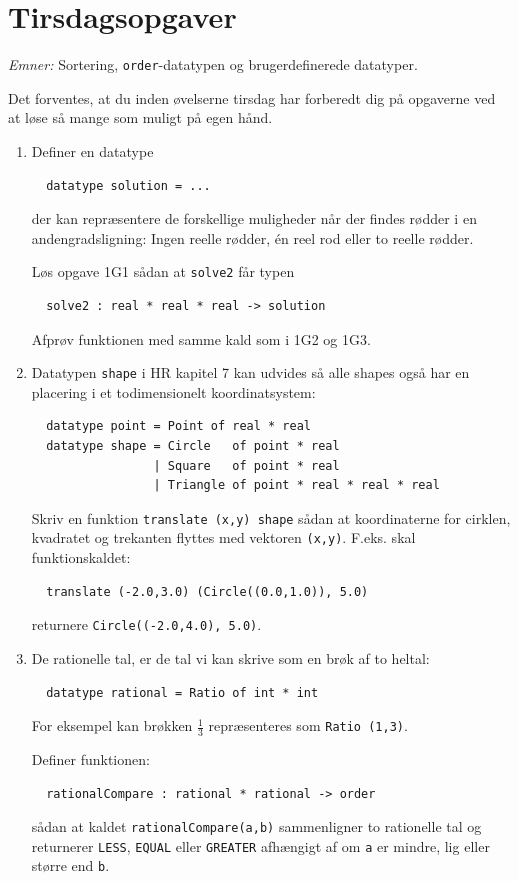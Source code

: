 \documentclass[a4paper,12pt]{article}
\begin{document}
\newpage
\section{Tirsdagsopgaver}
\label{sec:tirsdagsopgaver}
\textit{Emner:} Sortering, \lstinline{order}-datatypen og brugerdefinerede datatyper.

Det forventes, at du inden øvelserne tirsdag har forberedt dig på
opgaverne ved at løse så mange som muligt på egen hånd.
\begin{enumerate}[{4}T1]
\item Definer en datatype
\begin{lstlisting}
  datatype solution = ...
\end{lstlisting}
  der kan repræsentere de forskellige muligheder når der findes rødder
  i en andengradsligning: Ingen reelle rødder, én reel rod eller to
  reelle rødder.

Løs opgave 1G1 sådan at \lstinline{solve2} får typen
\begin{lstlisting}
  solve2 : real * real * real -> solution
\end{lstlisting}
Afprøv funktionen med samme kald som i 1G2 og 1G3.

\item Datatypen \lstinline{shape} i HR kapitel 7 kan udvides så alle
  shapes også har en placering i et todimensionelt koordinatsystem:
\begin{lstlisting}
  datatype point = Point of real * real
  datatype shape = Circle   of point * real
                 | Square   of point * real
                 | Triangle of point * real * real * real
\end{lstlisting}
  Skriv en funktion \lstinline{translate (x,y) shape} sådan at
  koordinaterne for cirklen, kvadratet og trekanten flyttes med
  vektoren \lstinline{(x,y)}. F.eks. skal funktionskaldet:
\begin{lstlisting}
  translate (-2.0,3.0) (Circle((0.0,1.0)), 5.0)
\end{lstlisting}
  returnere \lstinline{Circle((-2.0,4.0), 5.0)}.

\item  
De rationelle tal, er de tal vi kan skrive som en brøk af to
heltal:
\begin{lstlisting}
  datatype rational = Ratio of int * int
\end{lstlisting}
For eksempel kan brøkken $\frac{1}{3}$ repræsenteres som
\lstinline{Ratio (1,3)}.

Definer funktionen:
\begin{lstlisting}
  rationalCompare : rational * rational -> order
\end{lstlisting}
sådan at kaldet \lstinline{rationalCompare(a,b)} sammenligner to
rationelle tal og returnerer \lstinline{LESS}, \lstinline{EQUAL} eller
\lstinline{GREATER} afhængigt af om \lstinline{a} er mindre, lig eller
større end \lstinline{b}. 


\end{enumerate}
\end{document}
